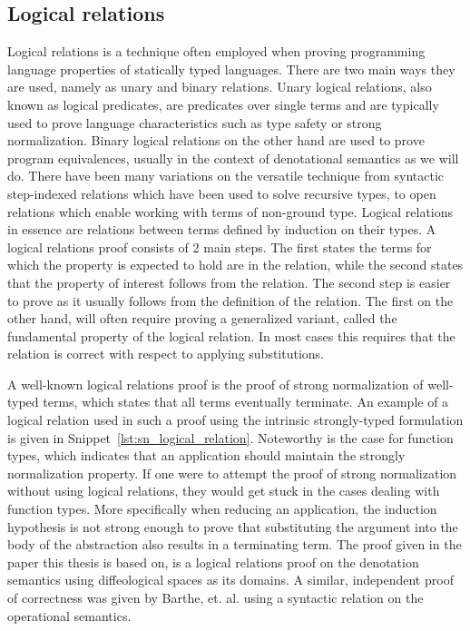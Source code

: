 \subsection{Logical relations}

Logical relations is a technique often employed when proving programming language properties of statically typed languages\cite{skorstengaard2019introduction}. There are two main ways they are used, namely as unary and binary relations.
Unary logical relations, also known as logical predicates, are predicates over single terms and are typically used to prove language characteristics such as type safety or strong normalization.
Binary logical relations on the other hand are used to prove program equivalences, usually in the context of denotational semantics as we will do.
There have been many variations on the versatile technique from syntactic step-indexed relations which have been used to solve recursive types\cite{Ahmed2006}, to open relations which enable working with terms of non-ground type\cite{barthe2020versatility}\cite{huot2020correctness}.
Logical relations in essence are relations between terms defined by induction on their types.
A logical relations proof consists of 2 main steps.
The first states the terms for which the property is expected to hold are in the relation, while the second states that the property of interest follows from the relation.
The second step is easier to prove as it usually follows from the definition of the relation. The first on the other hand, will often require proving a generalized variant, called the fundamental property of the logical relation.
In most cases this requires that the relation is correct with respect to applying substitutions.

A well-known logical relations proof is the proof of strong normalization of well-typed terms, which states that all terms eventually terminate.
An example of a logical relation used in such a proof using the intrinsic strongly-typed formulation is given in Snippet~\ref{lst:sn_logical_relation}.
Noteworthy is the case for function types, which indicates that an application should maintain the strongly normalization property.
If one were to attempt the proof of strong normalization without using logical relations, they would get stuck in the cases dealing with function types.
More specifically when reducing an application, the induction hypothesis is not strong enough to prove that substituting the argument into the body of the abstraction also results in a terminating term.
The proof given in the paper this thesis is based on, is a logical relations proof on the denotation semantics using diffeological spaces as its domains\cite{huot2020correctness}.
A similar, independent proof of correctness was given by Barthe, et. al.\cite{barthe2020versatility} using a syntactic relation on the operational semantics.

